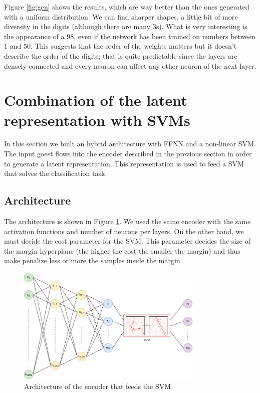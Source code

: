 \documentclass[compsoc]{IEEEtran}
\begin{document}
Figure \ref{fig:gen} shows the results, which are way better than the ones generated with a uniform distribution. We can find sharper shapes, a little bit of more
diversity in the digits (although there are many $3$s). What is very interesting is the appearance of a $98$, even if the network has been trained on numbers between $1$ and $50$. This suggests that the order of the weights matters but it doesn't describe the order of the digits; that is quite predictable since the layers are densely-connected and every neuron can affect any other neuron of the next layer.


\section{Combination of the latent representation with SVMs}
In this section we built an hybrid architecture with FFNN and a non-linear SVM. The input goest flows into the encoder described in the previous section in order to generate a latent representation. This representation is used to feed a SVM that solves the classification task. 
\subsection{Architecture}
The architecture is shown in Figure \ref{fig:svm}. We used the same encoder with the same activation functions and number of neurons per layers. On the other hand,
we must decide the cost parameter for the SVM. This parameter decides the size of the margin hyperplane (the higher the cost the smaller the margin) and thus make penalize less or more the samples inside the margin. \par

\begin{figure}[ht!]
\centering                                                                        
\includegraphics[width=3.5in]{svm.png}
\captionsetup{justification=centering}                                                                                       
\caption{Architecture of the encoder that feeds the SVM}
\label{fig:svm}
\end{figure}
\end{document}
